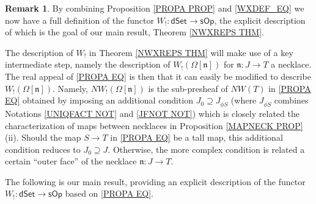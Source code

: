 \documentclass[a4paper,10pt
,draft
]{article}%
\numberwithin{equation}{section}
\numberwithin{figure}{section}
\theoremstyle{definition} %
\newtheorem{remark}[equation]{Remark}%
\newcommand{\sOp}{\ensuremath{\mathsf{sOp}}}%
\newcommand{\1}{\ensuremath{\mathbbm 1}}%
\begin{document}
\begin{remark}\label{DIRECTCONS REM}
	By combining Proposition \ref{PROPA PROP} and \eqref{WXDEF_EQ}
	we now have a full definition of the functor
	$W_! \colon \mathsf{dSet} \to \sOp$,
	the explicit description of which is the goal of our main result, Theorem \ref{NWXREPS THM}.
	
	The description of $W_!$ in Theorem \ref{NWXREPS THM}
	will make use of a key intermediate step,
	namely the description 
	of $W_!(\Omega[\mathfrak{n}])$
	for $\mathfrak{n}\colon J \to T$ a necklace.
	The real appeal of \eqref{PROPA EQ}
	is then that it can easily be modified to describe
	$W_!(\Omega[\mathfrak{n}])$.
	Namely,
	$N W_!(\Omega[\mathfrak{n}])$ is the sub-presheaf of 
	$NW(T)$ in \eqref{PROPA EQ}
	obtained by imposing an additional condition
	$J_0 \supseteq J_{\overline{\phi S}}$
	(where $J_{\overline{\phi S}}$ combines
	Notations \ref{UNIQFACT NOT} and \ref{JFNOT NOT})
	which is closely related the characterization of 
	maps between necklaces
	in Proposition \ref{MAPNECK PROP}(ii).
	Should the map $S\to T$ in \eqref{PROPA EQ} be a tall map,
	this additional condition reduces to $J_0 \supseteq J$.
	Otherwise, the more complex condition is related a certain ``outer face'' of the necklace $\mathfrak{n}\colon J\to T$.
\end{remark}



The following is our main result, 
providing an explicit description of the
functor $W_!\colon \mathsf{dSet} \to \mathsf{sOp}$
based on \eqref{PROPA EQ}.
\end{document}
